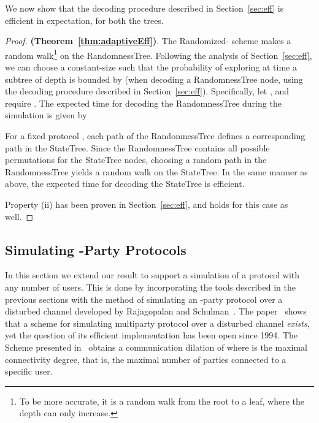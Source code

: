 \documentclass[ letterpaper, 11pt]{article}
\newcommand{\statetree}{{\textsf{StateTree}}\xspace}
\newcommand{\randomtree}{{\textsf{RandomnessTree}}\xspace}
\begin{document}
We now show that the decoding procedure described in Section~\ref{sec:eff} is efficient in expectation, for both the trees.
\begin{proof} \textbf{(Theorem~\ref{thm:adaptiveEff})}.
The Randomized- scheme makes a random walk\footnote{
    To be more accurate,
    it is a random walk from the root to a leaf, where the depth can only increase.}
on the \randomtree.
Following the analysis of Section~\ref{sec:eff},
we can choose a constant-size  such that
the probability of exploring at time  a subtree of depth 
is bounded by 
(when decoding a \randomtree node,
using the decoding procedure described in Section~\ref{sec:eff}).
Specifically, let
,
and require .
The expected time for decoding
the \randomtree during the simulation is given by


For a fixed protocol , each path of the \randomtree
defines a corresponding path in the \statetree. Since the \randomtree contains all
possible permutations
for the \statetree nodes, choosing a random path in the \randomtree yields a random walk on the
\statetree. In the same manner as above,
the expected time for decoding the \statetree is efficient.

Property (ii) has been proven in Section~\ref{sec:eff}, and holds for this case as well.
\end{proof}





\subsection{Simulating -Party Protocols}\label{sec:multiparty}


In this section we extend our result to support a simulation
of a protocol  with any number  of users.
This is done by incorporating the tools described in the previous sections
with the method of simulating an -party protocol over a disturbed channel
developed by Rajagopalan and Schulman~\cite{RS94}.
The paper~\cite{RS94} shows that a scheme for simulating multiparty protocol
over a disturbed channel
{\em exists},
yet the question of its efficient implementation has been open since 1994.
The Scheme presented in~\cite{RS94}
obtains a communication dilation of  where  is the maximal connectivity degree,
that is, the maximal number of parties connected to a specific user.
\end{document}
